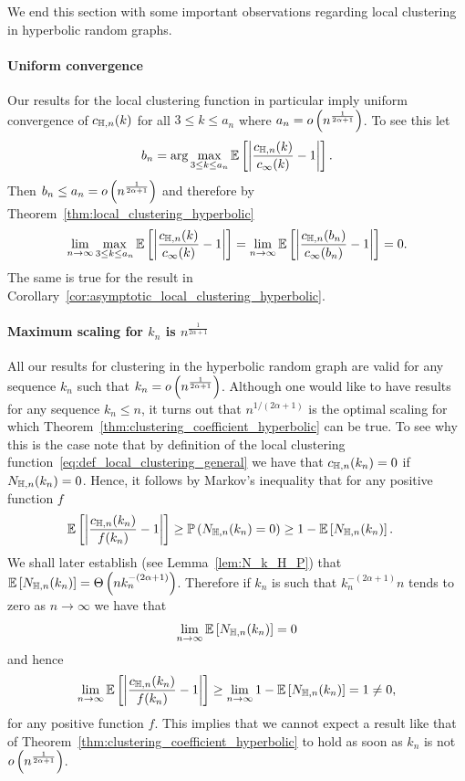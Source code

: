 We end this section with some important observations regarding local clustering in hyperbolic random graphs.



 

\paragraph{Uniform convergence}

Our results for the local clustering function in particular imply uniform convergence of $c_{\mathbb{H},n}(k)$ for all $3 \le k \le a_n$  where $a_n = o\left(n^{\frac{1}{2\alpha + 1}}\right)$. To see this let
\[
	b_n = \arg \max_{3 \le k \le a_n} \mathbb{E}\left[\left|\frac{c_{\mathbb{H} ,n}(k)}{c_\infty(k)} - 1\right|\right].
\]
Then $b_n \le a_n = o\left(n^{\frac{1}{2\alpha + 1}}\right)$ and therefore by Theorem~\ref{thm:local_clustering_hyperbolic}
\[
	\lim_{n \to \infty} \max_{3 \le k \le a_n} \mathbb{E}\left[\left|\frac{c_{\mathbb{H} ,n}(k)}{c_\infty(k)} - 1\right|\right] 
	= \lim_{n \to \infty}\mathbb{E}\left[\left|\frac{c_{\mathbb{H} ,n}(b_n)}{c_\infty(b_n)} - 1\right|\right] = 0.
\]
The same is true for the result in Corollary~\ref{cor:asymptotic_local_clustering_hyperbolic}.

\paragraph{Maximum scaling for $k_n$ is $n^{\frac{1}{2\alpha +1}}$}
All our results for clustering in the hyperbolic random graph are valid for any sequence $k_n$ such that $k_n = o\left(n^{\frac{1}{2\alpha + 1}}\right)$. Although one would like to have results for any sequence $k_n \le n$, it turns out that $n^{1/(2\alpha + 1)}$ is the optimal  scaling for which Theorem~\ref{thm:clustering_coefficient_hyperbolic} can be true. To see why this is the case note that by definition of the local clustering function~\eqref{eq:def_local_clustering_general} we have that $c_{\mathbb{H},n}(k_n) = 0$ if $N_{\mathbb{H},n}(k_n) = 0$. Hence, it follows by Markov's inequality that for any positive function $f$
\begin{align*}
	\mathbb{E}\left[\left|\frac{c_{\mathbb{H},n}(k_n)}{f(k_n)} - 1\right|\right] 
	&\ge \mathbb{P}\left(N_{\mathbb{H},n}(k_n) = 0\right) \ge 1 - \mathbb{E}\left[N_{\mathbb{H},n}(k_n)\right].
\end{align*}
We shall later establish (see Lemma~\ref{lem:N_k_H_P}) that $\mathbb{E}\left[N_{\mathbb{H},n}(k_n)\right] = \Theta\left(n k_n^{-(2\alpha + 1)}\right)$. Therefore if $k_n$ is such that $k_n^{-(2\alpha + 1)} n$ tends to zero as $n \to \infty$ we have that 
\[
	\lim_{n \to \infty} \mathbb{E}\left[N_{\mathbb{H},n}(k_n)\right] = 0
\]
and hence
\[
	\lim_{n \to \infty} \mathbb{E}\left[\left|\frac{c_{\mathbb{H},n}(k_n)}{f(k_n)} - 1\right|\right] 
	\ge \lim_{n \to \infty} 1 - \mathbb{E}\left[N_{\mathbb{H},n}(k_n)\right] = 1 \ne 0,
\]
for any positive function $f$. This implies that we cannot expect a result like that of Theorem~\ref{thm:clustering_coefficient_hyperbolic} to hold as soon as $k_n$ is not $o\left(n^{\frac{1}{2\alpha + 1}}\right)$.

